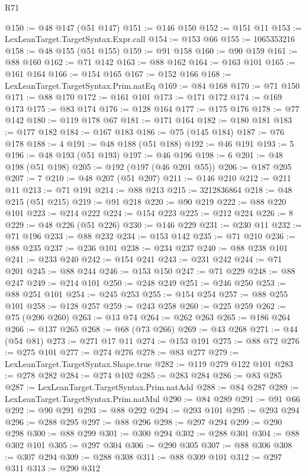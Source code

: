 \begin{lexlean}{R71}
\begin{coremodule}
@150 := @48 @147 (@51 @147)
@151 := @146 @150
@152 := @151 @11
@153 := LexLeanTarget.TargetSyntax.Expr.call
@154 := @153 @66
@155 := 1065353216
@158 := @48 @155 (@51 @155)
@159 := @91 @158
@160 := @90 @159
@161 := @88 @160
@162 := @71 @142
@163 := @88 @162
@164 := @163 @101
@165 := @161 @164
@166 := @154 @165
@167 := @152 @166
@168 := LexLeanTarget.TargetSyntax.Prim.natEq
@169 := @84 @168
@170 := @71 @150
@171 := @88 @170
@172 := @161 @101
@173 := @171 @172
@174 := @169 @173
@175 := @83 @174
@176 := @128 @164
@177 := @175 @176
@178 := @77 @142
@180 := @119 @178 @67
@181 := @171 @164
@182 := @180 @181
@183 := @177 @182
@184 := @167 @183
@186 := @75 (@145 @184)
@187 := @76 @178
@188 := 4
@191 := @48 @188 (@51 @188)
@192 := @46 @191
@193 := 5
@196 := @48 @193 (@51 @193)
@197 := @46 @196
@198 := 6
@201 := @48 @198 (@51 @198)
@205 := @192 (@197 (@46 @201 @55))
@206 := @187 @205
@207 := 7
@210 := @48 @207 (@51 @207)
@211 := @146 @210
@212 := @211 @11
@213 := @71 @191
@214 := @88 @213
@215 := 3212836864
@218 := @48 @215 (@51 @215)
@219 := @91 @218
@220 := @90 @219
@222 := @88 @220 @101
@223 := @214 @222
@224 := @154 @223
@225 := @212 @224
@226 := 8
@229 := @48 @226 (@51 @226)
@230 := @146 @229
@231 := @230 @11
@232 := @71 @196
@233 := @88 @232
@234 := @153 @142
@235 := @71 @210
@236 := @88 @235
@237 := @236 @101
@238 := @234 @237
@240 := @88 @238 @101
@241 := @233 @240
@242 := @154 @241
@243 := @231 @242
@244 := @71 @201
@245 := @88 @244
@246 := @153 @150
@247 := @71 @229
@248 := @88 @247
@249 := @214 @101
@250 := @248 @249
@251 := @246 @250
@253 := @88 @251 @101
@254 := @245 @253
@255 := @154 @254
@257 := @88 @255 @101
@258 := @128 @257
@259 := @243 @258
@260 := @225 @259
@262 := @75 (@206 @260)
@263 := @13 @74
@264 := @262 @263
@265 := @186 @264
@266 := @137 @265
@268 := @68 (@73 @266)
@269 := @43 @268
@271 := @44 (@54 @81)
@273 := @271 @17 @11
@274 := @153 @191
@275 := @88 @72
@276 := @275 @101
@277 := @274 @276
@278 := @83 @277
@279 := LexLeanTarget.TargetSyntax.Shape.true
@282 := @119 @279 @122 @101
@283 := @278 @282
@284 := @274 @102
@285 := @283 @284
@286 := @83 @285
@287 := LexLeanTarget.TargetSyntax.Prim.natAdd
@288 := @84 @287
@289 := LexLeanTarget.TargetSyntax.Prim.natMul
@290 := @84 @289
@291 := @91 @66
@292 := @90 @291
@293 := @88 @292
@294 := @293 @101
@295 := @293 @294
@296 := @288 @295
@297 := @88 @296
@298 := @297 @294
@299 := @290 @298
@300 := @88 @299
@301 := @300 @294
@302 := @288 @301
@304 := @88 @302 @101
@305 := @297 @304
@306 := @290 @305
@307 := @88 @306
@308 := @307 @294
@309 := @288 @308
@311 := @88 @309 @101
@312 := @297 @311
@313 := @290 @312

\end{coremodule}
\end{lexlean}

